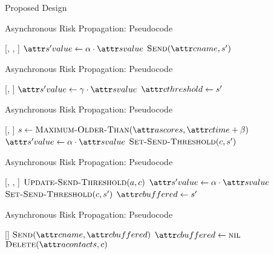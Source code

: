 \documentclass[11pt]{beamer}
\begin{document}
\begin{section}{Proposed Design}
\begin{frame}{Asynchronous Risk Propagation: Pseudocode}
\begin{function}{\nApplyRiskScore}[\vActor, \vContact, \vScore]
  \If{$\aContactTime + \pTimeBuffer > \aScoreTime$}
    \pause
    \State $\aNewScoreValue \assign \pTransmissionRate \cdot \aScoreValue$
    \pause
    \State $\cSend[\aContactName, \vNewScore]$
  \EndIf
\end{function}
\end{frame}

\begin{frame}{Asynchronous Risk Propagation: Pseudocode}
\begin{function}{\nSetSendThreshold}[\vContact, \vScore]
  \State $\aNewScoreValue \assign \pSendCoefficient \cdot \aScoreValue$
  \pause
  \State $\aContactThreshold \assign \vNewScore$
\end{function}
\end{frame}

\begin{frame}{Asynchronous Risk Propagation: Pseudocode}
\begin{function}{\nUpdateSendThreshold}[\vActor, \vContact]
    \pause
      \pause
      \State $\vScore \assign \cMaximumOlderThan[\aActorScores, \aContactTime + \pTimeBuffer]$
        \pause
      \State $\aNewScoreValue \assign \pTransmissionRate \cdot \aScoreValue$
        \pause
      \State $\cSetSendThreshold[\vContact, \vNewScore]$
    \EndIf
  \EndIf
\end{function}
\end{frame}

\begin{frame}{Asynchronous Risk Propagation: Pseudocode}
\begin{function}{\nApplyRiskScore}[\vActor, \vContact, \vScore]
  \State $\cUpdateSendThreshold[\vActor, \vContact]$
  \pause
  \If{$\aContactThresholdValue < \aScoreValue \AND \aContactTime + \pTimeBuffer > \aScoreTime$}
    \pause
    \State $\aNewScoreValue \assign \pTransmissionRate \cdot \aScoreValue$
    \pause
    \State $\cSetSendThreshold[\vContact, \vNewScore]$
    \pause
    \State $\aContactBuffered \assign \vNewScore$
  \EndIf
\end{function}
\end{frame}

\begin{frame}{Asynchronous Risk Propagation: Pseudocode}
\begin{function}{\nHandleFlushTimeout}[\vActor]
  \ForEach{$\vContact \in \aActorContacts$}
    \pause
    \If{$\aContactBuffered \notEquals \nil$}
      \pause
      \State $\cSend[\aContactName, \aContactBuffered]$
      \pause
      \State $\aContactBuffered \assign \nil$
    \EndIf
    \pause
      \State $\cDelete[\aActorContacts, \vContact]$
    \EndIf
  \EndFor
\end{function}
\end{frame}


\end{section}
\end{document}
